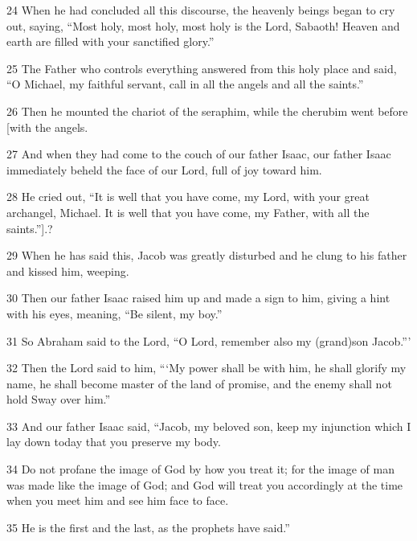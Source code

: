 \par 24 When he had concluded all this discourse, the heavenly beings began to cry out, saying, “Most holy, most holy, most holy is the Lord, Sabaoth! Heaven and earth are filled with your sanctified glory.” 

\par 25 The Father who controls everything answered from this holy place and said, “O Michael, my faithful servant, call in all the angels and all the saints.” 

\par 26 Then he mounted the chariot of the seraphim, while the cherubim went before [with the angels. 

\par 27 And when they had come to the couch of our father Isaac, our father Isaac immediately beheld the face of our Lord, full of joy toward him. 

\par 28 He cried out, “It is well that you have come, my Lord, with your great archangel, Michael. It is well that you have come, my Father, with all the saints.”].? 

\par 29 When he has said this, Jacob was greatly disturbed and he clung to his father and kissed him, weeping. 

\par 30 Then our father Isaac raised him up and made a sign to him, giving a hint with his eyes, meaning, “Be silent, my boy.” 

\par 31 So Abraham said to the Lord, “O Lord, remember also my (grand)son Jacob.”’ 

\par 32 Then the Lord said to him, “‘My power shall be with him, he shall glorify my name, he shall become master of the land of promise, and the enemy shall not hold Sway over him.” 

\par 33 And our father Isaac said, “Jacob, my beloved son, keep my injunction which I lay down today that you preserve my body. 

\par 34 Do not profane the image of God by how you treat it; for the image of man was made like the image of God; and God will treat you accordingly at the time when you meet him and see him face to face. 

\par 35 He is the first and the last, as the prophets have said.” 

